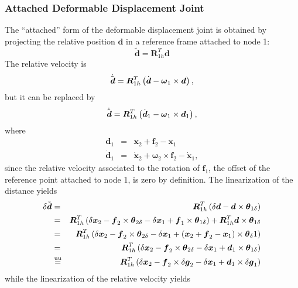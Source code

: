 \documentclass[10pt,dvips,fleqn]{report}
\newcommand{\T}[1]{\boldsymbol{#1}}
\newcommand{\equu}{\overset{\mathrm{uu}}{=}}
\begin{document}
\subsubsection{Attached Deformable Displacement Joint}
The ``attached'' form of the deformable displacement joint
is obtained by projecting the relative position $\T{d}$
in a reference frame attached to node 1:
\begin{equation}
	\tilde{\T{d}} = \T{R}_{1h}^T \T{d}
\end{equation}
The relative velocity is
\begin{equation}
	\dot{\tilde{\T{d}}} = \T{R}_{1h}^T\plbr{
		\dot{\T{d}} - \T{\omega}_1 \times \T{d}
	} ,
\end{equation}
but it can be replaced by
\begin{equation}
	\dot{\tilde{\T{d}}} = \T{R}_{1h}^T\plbr{
		\dot{\T{d}}_1 - \T{\omega}_1 \times \T{d}_1
	} ,
\end{equation}
where
\begin{eqnarray*}
	\T{d}_1 & = & \T{x}_2 + \T{f}_2 - \T{x}_1 \\
	\dot{\T{d}}_1 & = & \dot{\T{x}}_2 + \T{\omega}_2 \times \T{f}_2 - \dot{\T{x}}_1 ,
\end{eqnarray*}
since the relative velocity associated to the rotation of $\T{f}_1$,
the offset of the reference point attached to node 1,
is zero by definition.
The linearization of the distance yields
\begin{eqnarray*}
	\delta{\tilde{\T{d}}} & = & \T{R}_{1h}^T\plbr{
		\delta\T{d} - \T{d} \times \T{\theta}_{1\delta}
	} \\
	& = & \T{R}_{1h}^T\plbr{
		\delta{\T{x}}_2 - \T{f}_2\times\T{\theta}_{2\delta}
		- \delta{\T{x}}_1 + \T{f}_1\times\T{\theta}_{1\delta}
	} + \T{R}_{1h}^T \T{d}\times\T{\theta}_{1\delta} \\
	& = & \T{R}_{1h}^T\plbr{
		\delta{\T{x}}_2
		- \T{f}_2\times\T{\theta}_{2\delta}
		- \delta{\T{x}}_1
		+ \plbr{
			\T{x}_2
			+ \T{f}_2
			- \T{x}_1
		}\times\T{\theta}_{\delta}1
	} \\
	& = & \T{R}_{1h}^T\plbr{
		\delta{\T{x}}_2
		- \T{f}_2\times\T{\theta}_{2\delta}
		- \delta{\T{x}}_1
		+ \T{d}_1\times\T{\theta}_{1\delta}
	} \\
	& \equu & \T{R}_{1h}^T\plbr{
		\delta{\T{x}}_2
		- \T{f}_2\times\delta\T{g}_2
		- \delta{\T{x}}_1
		+ \T{d}_1\times\delta\T{g}_1
	}
\end{eqnarray*}
while the linearization of the relative velocity yields
\end{document}
